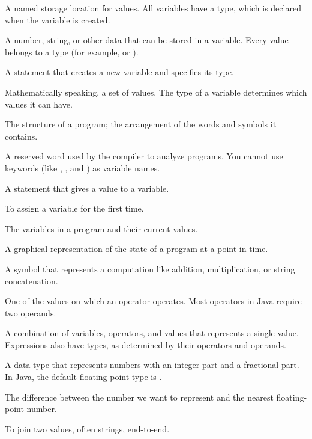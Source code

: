 \begin{description}

A named storage location for values.
All variables have a type, which is declared when the variable is created.

A number, string, or other data that can be stored in a variable.
Every value belongs to a type (for example,  or ).

A statement that creates a new variable and specifies its type.

Mathematically speaking, a set of values.
The type of a variable determines which values it can have.

The structure of a program; the arrangement of the words and symbols it contains.

A reserved word used by the compiler to analyze programs.
You cannot use keywords (like , , and ) as variable names.

A statement that gives a value to a variable.

To assign a variable for the first time.


The variables in a program and their current values.

A graphical representation of the state of a program at a point in time.

A symbol that represents a computation like addition, multiplication, or string concatenation.

One of the values on which an operator operates.
Most operators in Java require two operands.

A combination of variables, operators, and values that represents a single value.
Expressions also have types, as determined by their operators and operands.

A data type that represents numbers with an integer part and a fractional part.
In Java, the default floating-point type is .

The difference between the number we want to represent and the nearest floating-point number.

To join two values, often strings, end-to-end.


\end{description}
